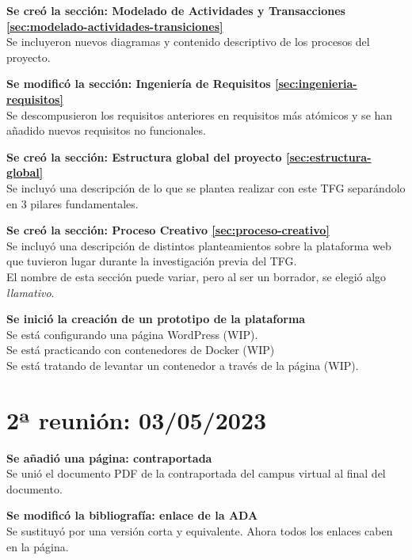         \textbf{Se creó la sección: Modelado de Actividades y Transacciones \ref{sec:modelado-actividades-transiciones}} \\
        Se incluyeron nuevos diagramas y contenido descriptivo de los procesos del proyecto.
        
        \textbf{Se modificó la sección: Ingeniería de Requisitos \ref{sec:ingenieria-requisitos}} \\
        Se descompusieron los requisitos anteriores en requisitos más atómicos y se han añadido nuevos requisitos no funcionales.
    
        \textbf{Se creó la sección: Estructura global del proyecto \ref{sec:estructura-global}} \\
        Se incluyó una descripción de lo que se plantea realizar con este TFG separándolo en 3 pilares fundamentales.
    
        \textbf{Se creó la sección: Proceso Creativo \ref{sec:proceso-creativo}} \\
        Se incluyó una descripción de distintos planteamientos sobre la plataforma web que tuvieron lugar durante la investigación previa del TFG. \\
        El nombre de esta sección puede variar, pero al ser un borrador, se elegió algo \textit{llamativo}.
    
        \textbf{Se inició la creación de un prototipo de la plataforma} \\
        Se está configurando una página WordPress (WIP).\\
        Se está practicando con contenedores de Docker (WIP)\\ 
        Se está tratando de levantar un contenedor a través de la página (WIP).

        \newpage


    \section{2ª reunión: 03/05/2023}

        \textbf{Se añadió una página: contraportada} \\
        Se unió el documento PDF de la contraportada del campus virtual al final del documento.

        \textbf{Se modificó la bibliografía: enlace de la ADA \cite{articulo-ada}} \\
        Se sustituyó por una versión corta y equivalente. Ahora todos los enlaces caben en la página.

